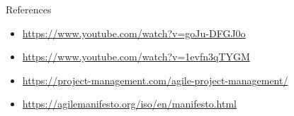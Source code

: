 \documentclass[10pt]{beamer}
\begin{document}
\begin{frame}{References}
  \begin{itemize}
    \item \href{https://www.youtube.com/watch?v=goJu-DFGJ0o}{https://www.youtube.com/watch?v=goJu-DFGJ0o}
    \item \href{https://www.youtube.com/watch?v=1evfn3qTYGM}{https://www.youtube.com/watch?v=1evfn3qTYGM}
    \item \href{https://project-management.com/agile-project-management/}{https://project-management.com/agile-project-management/}
    \item \href{https://agilemanifesto.org/iso/en/manifesto.html}{https://agilemanifesto.org/iso/en/manifesto.html}
  \end{itemize}
\end{frame}
\end{document}
